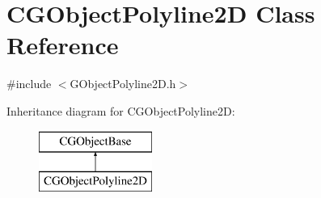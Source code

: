 \hypertarget{class_c_g_object_polyline2_d}{}\section{C\+G\+Object\+Polyline2\+D Class Reference}
\label{class_c_g_object_polyline2_d}


{\ttfamily \#include $<$G\+Object\+Polyline2\+D.\+h$>$}

Inheritance diagram for C\+G\+Object\+Polyline2\+D\+:\begin{figure}[H]
\begin{center}
\leavevmode
\includegraphics[height=2.000000cm]{class_c_g_object_polyline2_d}
\end{center}
\end{figure}
